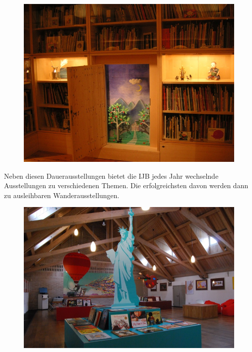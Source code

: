 \documentclass[a4paper,
fontsize=11pt,
oneside,
numbers=noperiodatend,
parskip=half-,
bibliography=totoc,
final
]{scrartcl}
\begin{document}
\begin{figure}[htbp]
\centering
\includegraphics{img/bild27.jpg}
\end{figure}

Neben diesen Dauerausstellungen bietet die IJB jedes Jahr wechselnde
Ausstellungen zu verschiedenen Themen. Die erfolgreichsten davon werden
dann zu ausleihbaren Wanderausstellungen.

\begin{figure}[htbp]
\centering
\includegraphics{img/bild28.jpg}
\end{figure}
\end{document}
